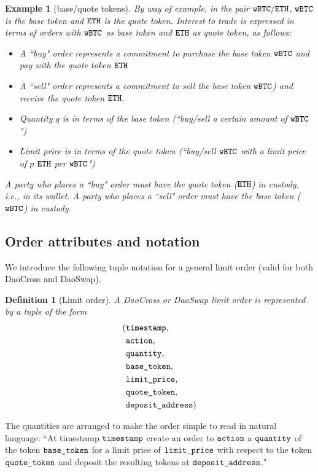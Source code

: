 \documentclass[11pt, reqno]{amsart}
\newtheorem{definition}[thm]{Definition}
\newtheorem{example}[thm]{Example}
\newcommand{\BTC}{\textnormal{\texttt{wBTC}}}
\newcommand{\ETH}{\textnormal{\texttt{ETH}}}
\newcommand{\timestamp}{\textnormal{\texttt{timestamp}}}
\newcommand{\action}{\textnormal{\texttt{action}}}
\newcommand{\quantity}{\textnormal{\texttt{quantity}}}
\newcommand{\basetoken}{\textnormal{\texttt{base\_token}}}
\newcommand{\limitprice}{\textnormal{\texttt{limit\_price}}}
\newcommand{\quotetoken}{\textnormal{\texttt{quote\_token}}}
\newcommand{\depositaddress}{\textnormal{\texttt{deposit\_address}}}
\begin{document}
\begin{example}[base/quote tokens]
By way of example, in the pair $\BTC/\ETH$, $\BTC$ is the base token and $\ETH$
is the quote token. Interest to trade is expressed in terms of orders
with $\BTC$ as base token and $\ETH$ as quote token, as follows:
\begin{itemize}
	\item A ``buy" order represents a commitment to purchase the base token
        $\BTC$ and pay with the quote token $\ETH$
	\item A ``sell" order represents a commitment to sell the base token
	      $\BTC$) and receive the quote token $\ETH$.
	\item Quantity $q$ is in terms of the base token (``buy/sell a certain
	      amount of $\BTC$")
	\item Limit price is in terms of the quote token (``buy/sell $\BTC$ with a
	      limit price of $p$ $\ETH$ per $\BTC$")
\end{itemize}
A party who places a ``buy" order must have the quote token ($\ETH$) in custody,
i.e., in its wallet. A party who places a ``sell" order must have the base
token ($\BTC$) in custody.
\end{example}

\subsection{Order attributes and notation}
We introduce the following tuple notation for a general limit order
(valid for both DaoCross and DaoSwap).
\begin{definition}[Limit order]
A DaoCross or DaoSwap limit order is represented by a tuple of the form
\begin{align*}
    ( & \timestamp, \\
    & \action, \\
    & \quantity, \\
    & \basetoken, \\
    & \limitprice, \\
    & \quotetoken, \\
    & \depositaddress )
\end{align*}
\end{definition}

The quantities are arranged to make the order simple to read in natural
language:
``At timestamp $\timestamp$ create an order to $\action$ a $\quantity$ of
the token $\basetoken$ for a limit price of $\limitprice$ with respect to
the token $\quotetoken$ and deposit the resulting tokens at $\depositaddress$."
\end{document}
